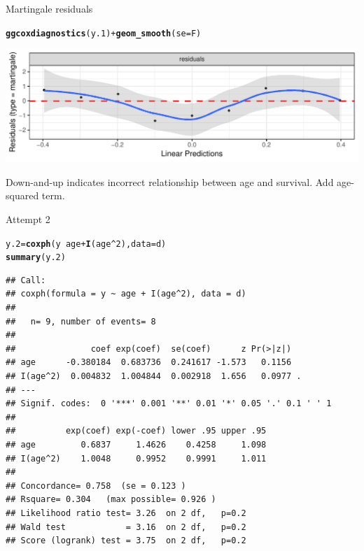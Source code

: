 \documentclass[unknownkeysallowed]{beamer}\usepackage[]{graphicx}\usepackage[]{color}
\makeatletter
\def\maxwidth{ %
  \ifdim\Gin@nat@width>\linewidth
    \linewidth
  \else
    \Gin@nat@width
  \fi
}
\newcommand{\hlnum}[1]{\textcolor[rgb]{0.686,0.059,0.569}{#1}}%
\newcommand{\hlopt}[1]{\textcolor[rgb]{0,0,0}{#1}}%
\newcommand{\hlstd}[1]{\textcolor[rgb]{0.345,0.345,0.345}{#1}}%
\newcommand{\hlkwb}[1]{\textcolor[rgb]{0.69,0.353,0.396}{#1}}%
\newcommand{\hlkwc}[1]{\textcolor[rgb]{0.333,0.667,0.333}{#1}}%
\newcommand{\hlkwd}[1]{\textcolor[rgb]{0.737,0.353,0.396}{\textbf{#1}}}%
\newenvironment{kframe}{%
 \def\at@end@of@kframe{}%
 \ifinner\ifhmode%
  \def\at@end@of@kframe{\end{minipage}}%
  \begin{minipage}{\columnwidth}%
 \fi\fi%
 \def\FrameCommand##1{\hskip\@totalleftmargin \hskip-\fboxsep
 \colorbox{shadecolor}{##1}\hskip-\fboxsep
     \hskip-\linewidth \hskip-\@totalleftmargin \hskip\columnwidth}%
 \MakeFramed {\advance\hsize-\width
   \@totalleftmargin\z@ \linewidth\hsize
   \@setminipage}}%
 {\par\unskip\endMakeFramed%
 \at@end@of@kframe}
\newenvironment{knitrout}{}{} %
\makeatother
\begin{document}
\begin{frame}[fragile]{Martingale residuals}

\begin{knitrout}
\color{fgcolor}\begin{kframe}
\begin{alltt}
\hlkwd{ggcoxdiagnostics}\hlstd{(y.1)}\hlopt{+}\hlkwd{geom_smooth}\hlstd{(}\hlkwc{se}\hlstd{=F)}
\end{alltt}


{\ttfamily\noindent\itshape{}}\end{kframe}
\includegraphics[width=\maxwidth]{figure/unnamed-chunk-151-1} 

\end{knitrout}

Down-and-up indicates incorrect relationship between age and
survival. Add age-squared term.
\end{frame}

\begin{frame}[fragile]{Attempt 2}
  
\begin{knitrout}\scriptsize
{}\color{fgcolor}\begin{kframe}
\begin{alltt}
\hlstd{y.2}\hlkwb{=}\hlkwd{coxph}\hlstd{(y}\hlopt{~}\hlstd{age}\hlopt{+}\hlkwd{I}\hlstd{(age}\hlopt{^}\hlnum{2}\hlstd{),}\hlkwc{data}\hlstd{=d)}
\hlkwd{summary}\hlstd{(y.2)}
\end{alltt}
\begin{verbatim}
## Call:
## coxph(formula = y ~ age + I(age^2), data = d)
## 
##   n= 9, number of events= 8 
## 
##               coef exp(coef)  se(coef)      z Pr(>|z|)  
## age      -0.380184  0.683736  0.241617 -1.573   0.1156  
## I(age^2)  0.004832  1.004844  0.002918  1.656   0.0977 .
## ---
## Signif. codes:  0 '***' 0.001 '**' 0.01 '*' 0.05 '.' 0.1 ' ' 1
## 
##          exp(coef) exp(-coef) lower .95 upper .95
## age         0.6837     1.4626    0.4258     1.098
## I(age^2)    1.0048     0.9952    0.9991     1.011
## 
## Concordance= 0.758  (se = 0.123 )
## Rsquare= 0.304   (max possible= 0.926 )
## Likelihood ratio test= 3.26  on 2 df,   p=0.2
## Wald test            = 3.16  on 2 df,   p=0.2
## Score (logrank) test = 3.75  on 2 df,   p=0.2
\end{verbatim}
\end{kframe}
\end{knitrout}
  
\end{frame}
\end{document}
